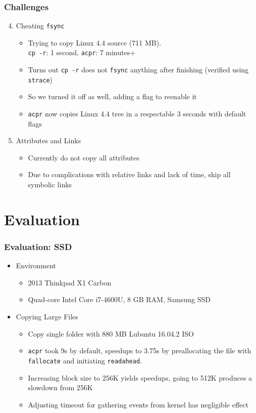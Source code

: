 \documentclass{beamer}
\begin{document}
\begin{frame}
    \frametitle{Challenges}
    \begin{enumerate}[1.]
	    \setcounter{enumi}{3}
	\item{Cheating \texttt{fsync}}
	    \begin{itemize}
		\item{Trying to copy Linux 4.4 source (711 MB). \\ 
		    \texttt{cp -r}: 1 second, \texttt{acpr}: 7 minutes+}
		\item{Turns out \texttt{cp -r} does not \texttt{fsync} anything after finishing 
		    (verified using \texttt{strace})}
		\item{So we turned it off as well, adding a flag to reenable it}
		\item{\texttt{acpr} now copies Linux 4.4 tree in a respectable 3 seconds with default flags}
	    \end{itemize}
	\item{Attributes and Links}
	    \begin{itemize}
		\item{Currently do not copy all attributes}
		\item{Due to complications with relative links and lack of time, skip all symbolic links}
	    \end{itemize}
    \end{enumerate}
\end{frame}

\section{Evaluation}
\begin{frame}
    \frametitle{Evaluation: SSD}
    \begin{itemize}
	\item{Environment}
	    \begin{itemize}
		\item 2013 Thinkpad X1 Carbon
		\item Quad-core Intel Core i7-4600U, 8 GB RAM, Samsung SSD
	    \end{itemize}
	\item{Copying Large Files}
	    \begin{itemize}
		\item Copy single folder with 880 MB Lubuntu 16.04.2 ISO
		\item \texttt{acpr} took 9s by default, speedups to 3.75s by preallocating the file with \texttt{fallocate} and initiating \texttt{readahead}.
		\item Increasing block size to 256K yields speedups, going to 512K produces a slowdown from 256K
		\item Adjusting timeout for gathering events from kernel has negligible effect
	    \end{itemize}
    \end{itemize}
\end{frame}
\end{document}
